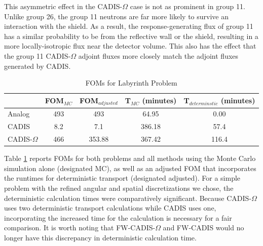 \documentclass[12pt]{article}
\begin{document}
This asymmetric effect in the CADIS-$\Omega$ case is not as prominent in group 11. 
Unlike group 26, the group 11 neutrons are far more likely to survive an interaction with the shield. As a result, the response-generating flux of group 11 has a similar probability to be from the reflective wall or the shield, resulting in a more locally-isotropic flux near the detector volume. This also has the effect that the group 11 CADIS-$\Omega$ adjoint fluxes more closely match the adjoint fluxes generated by CADIS. 
 

 \begin{table}
  \centering
  \caption{\label{tab:FOMLabI}FOMs for Labyrinth Problem}
  \begin{tabular}{l|cc|cc}
    \toprule
    \hline
        & FOM$_{MC}$ & FOM$_{adjusted}$ & T$_{MC}$ (minutes) & T$_{determinstic}$ (minutes) \\
    \hline
    Analog           & 493   &  493     & 64.95      & 0.00 \\ 
    CADIS            & 8.2   &  7.1     & 386.18     & 57.4  \\
    CADIS-$\Omega$   & 466   &  353.88  & 367.42     & 116.4  \\  
	\bottomrule
  \end{tabular}
\end{table}


Table \ref{tab:FOMLabI} reports FOMs for both problems and all methods using the Monte Carlo simulation alone (designated MC), as well as an adjusted FOM that incorporates the runtimes for deterministic transport (designated adjusted). For a simple problem with the refined angular and spatial discretizations we chose, the deterministic calculation times were comparatively significant.
Because CADIS-$\Omega$ uses two deterministic transport calculations while CADIS uses one, incorporating the increased time for the calculation is necessary for a fair comparison.
It is worth noting that FW-CADIS-$\Omega$ and FW-CADIS would no longer have this discrepancy in deterministic calculation time.
\end{document}

